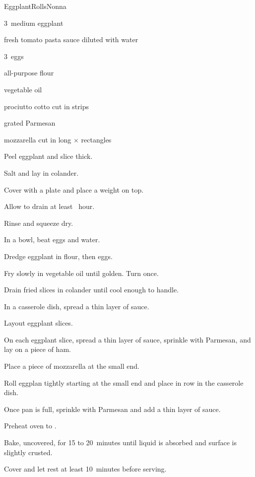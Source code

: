 \begin{recipe}{EggplantRolls}{Nonna}{}

\begin{ingredients}
\item 3~medium eggplant
\item fresh tomato pasta sauce diluted with water
\item 3~eggs
\item all-purpose flour
\item vegetable oil
\item prociutto cotto cut in  strips
\item grated Parmesan
\item mozzarella cut in long \inch{\quarter}$\times$\inch{\quarter} rectangles
\end{ingredients}

\begin{directions}
\item Peel eggplant and slice \inch{\quarter} thick.
\item Salt and lay in colander.
\item Cover with a plate and place a weight on top.
\item Allow to drain at least \half{}~hour.
\item Rinse and squeeze dry.
\item In a bowl, beat eggs and \C{\half} water.
\item Dredge eggplant in flour, then eggs.
\item Fry slowly in  vegetable oil until golden. Turn once.
\item Drain fried slices in colander until cool enough to handle.
\item In a casserole dish, spread a thin layer of sauce.
\item Layout eggplant slices.
\item On each eggplant slice, spread a thin layer of sauce, sprinkle with Parmesan, and lay on a piece of ham.
\item Place a piece of mozzarella at the small end.
\item Roll eggplan tightly starting at the small end and place in row in the casserole dish.
\item Once pan is full, sprinkle with Parmesan and add a thin layer of sauce.
\item Preheat oven to .
\item Bake, uncovered, for 15 to 20~minutes until liquid is absorbed and surface is slightly crusted.
\item Cover and let rest at least 10~minutes before serving.
\end{directions}

\end{recipe}
